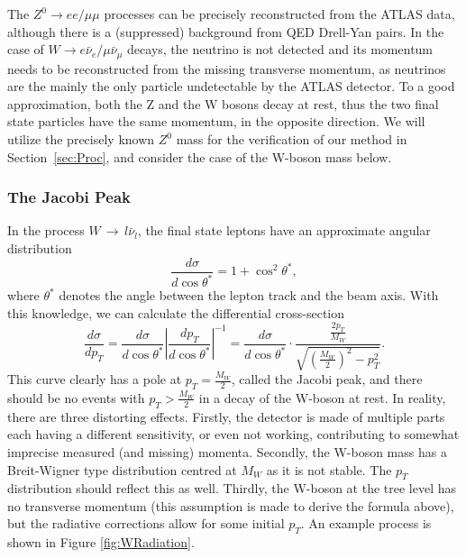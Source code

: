 \documentclass[twocolumn]{article}
\begin{document}
The $Z^0 \rightarrow ee/\mu\mu$ processes can be precisely reconstructed from the ATLAS data, although there is a (suppressed) background from QED Drell-Yan pairs. In the case of $W \rightarrow e \bar{\nu}_e/\mu \bar{\nu}_\mu$ decays, the neutrino is not detected and its momentum needs to be reconstructed from the missing transverse momentum, as neutrinos are the mainly the only particle undetectable by the ATLAS detector. To a good approximation, both the Z and the W bosons decay at rest, thus the two final state particles have the same momentum, in the opposite direction. We will utilize the precisely known $Z^0$ mass for the verification of our method in Section~\ref{sec:Proc}, and consider the case of the W-boson mass below. 
\subsubsection{The Jacobi Peak}
In the process $W \, \rightarrow \, l \bar{\nu}_l$, the final state leptons have an approximate angular distribution~\cite{manual}
\begin{equation}
\frac{d\sigma}{d\cos \theta^*} = 1 + \cos^2 \theta^*, \nonumber
\end{equation}
where $\theta^*$ denotes the angle between the lepton track and the beam axis.
With this knowledge, we can calculate the differential cross-section
\begin{equation}
\frac{d \sigma}{d p_T} = \frac{d \sigma}{d \cos \theta^*} \left\vert \frac{d p_T}{d \cos \theta^*} \right\vert^{-1} = \frac{d \sigma}{d \cos \theta^*} \cdot  \frac{\frac{2p_T}{M_W}}{\sqrt{\left( \frac{M_W}{2}\right)^2 - p_T^2}}. \nonumber
\end{equation}
This curve clearly has a pole at $p_T = \frac{M_W}{2}$, called the Jacobi peak, and there should be no events with $p_T > \frac{M_W}{2}$ in a decay of the W-boson at rest. In reality, there are three distorting effects. Firstly, the detector is made of multiple parts each having a different sensitivity, or even not working, contributing to somewhat imprecise measured (and missing) momenta. Secondly, the W-boson mass has a Breit-Wigner type distribution centred at $M_W$ as it is not stable. The $p_T$ distribution should reflect this as well. Thirdly, the W-boson at the tree level has no transverse momentum (this assumption is made to derive the formula above), but the radiative corrections allow for some initial $p_T$. An example process is shown in Figure \ref{fig:WRadiation}. 
\end{document}
